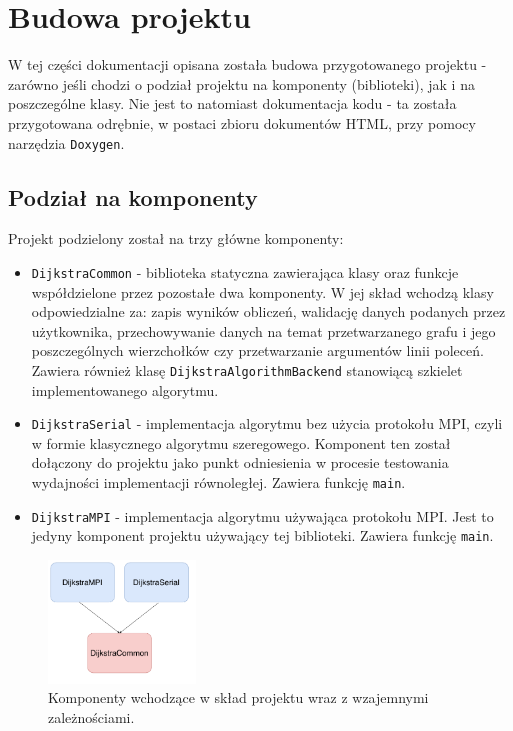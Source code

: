 \documentclass[12pt]{article}
\begin{document}
\newpage
\section{Budowa projektu}
W tej części dokumentacji opisana została budowa przygotowanego projektu - zarówno jeśli chodzi o podział projektu na komponenty (biblioteki), jak i na poszczególne klasy. Nie jest to natomiast dokumentacja kodu - ta została przygotowana odrębnie, w postaci zbioru dokumentów HTML, przy pomocy narzędzia \lstinline{Doxygen}.

\subsection{Podział na komponenty}
Projekt podzielony został na trzy główne komponenty:
\begin{itemize}
\item \lstinline{DijkstraCommon} - biblioteka statyczna zawierająca klasy oraz funkcje współdzielone przez pozostałe dwa komponenty. W jej skład wchodzą klasy odpowiedzialne za: zapis wyników obliczeń, walidację danych podanych przez użytkownika, przechowywanie danych na temat przetwarzanego grafu i jego poszczególnych wierzchołków czy przetwarzanie argumentów linii poleceń. Zawiera również klasę \lstinline{DijkstraAlgorithmBackend} stanowiącą szkielet implementowanego algorytmu.
\item \lstinline{DijkstraSerial} - implementacja algorytmu bez użycia protokołu MPI, czyli w formie klasycznego algorytmu szeregowego. Komponent ten został dołączony do projektu jako punkt odniesienia w procesie testowania wydajności implementacji równoległej. Zawiera funkcję \lstinline{main}.
\item \lstinline{DijkstraMPI} - implementacja algorytmu używająca protokołu MPI. Jest to jedyny komponent projektu używający tej biblioteki. Zawiera funkcję \lstinline{main}.
\end{itemize}
\begin{figure}[H]
\centering
\includegraphics[width=0.35\textwidth]{static/DijkstraArch1.pdf}
\caption{Komponenty wchodzące w skład projektu wraz z wzajemnymi zależnościami.}
\label{fig:arch1}
\end{figure}
\end{document}
